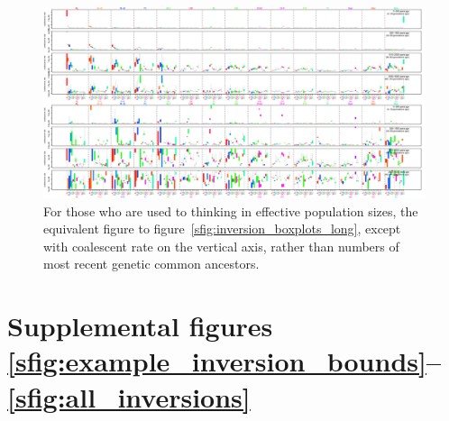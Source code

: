 \documentclass{article}
\begin{document}
\begin{figure}[!htp]
  \begin{center}
    
    \vspace{2em}
    \begin{center}
      \includegraphics{inversion-boxplots-long-coal}
    \end{center}
    \vspace{2em}
    \caption{
    For those who are used to thinking in effective population sizes,
    the equivalent figure to figure~\ref{sfig:inversion_boxplots_long},
    except with coalescent rate on the vertical axis, 
    rather than numbers of most recent genetic common ancestors.
    \label{sfig:inversion_boxplots_long_coal}
    }
  \end{center}
\end{figure}

\section*{Supplemental figures \ref{sfig:example_inversion_bounds}--\ref{sfig:all_inversions}}
\end{document}
